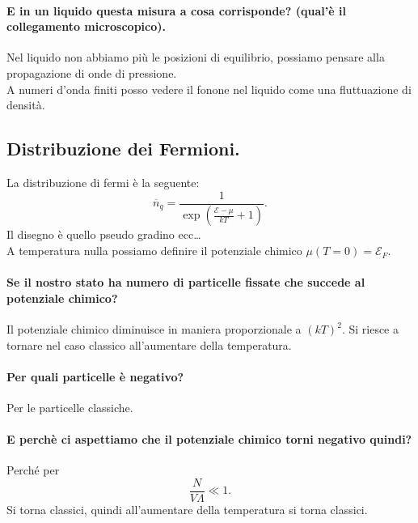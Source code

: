 \paragraph{E in un liquido questa misura a cosa corrisponde? (qual'è il collegamento microscopico).}%
\label{par:E in un liquido questa misura a cosa corrisponde? (qual'è il collegamento microscopico).}
Nel liquido non abbiamo più le posizioni di equilibrio, possiamo pensare alla propagazione di onde di pressione. \\
A numeri d'onda finiti posso vedere il fonone nel liquido come una fluttuazione di densità. 
\subsection{Distribuzione dei Fermioni.}%
\label{sub:Distribuzione dei Fermioni.}
La distribuzione di fermi è la seguente:
\[
    \overline{n}_q = \frac{1}{\exp\left(\frac{\mathcal{E}-\mu}{kT}+1\right)}
.\] 
Il disegno è quello pseudo gradino  ecc\ldots\\
A temperatura nulla possiamo definire il potenziale chimico $\mu (T=0) = \mathcal{E}_F$. 
\paragraph{Se il nostro stato ha numero di particelle fissate che succede al potenziale chimico?}%
\label{par:Se il nostro stato ha numero di particelle fissate che succede al potenziale chimico?}
Il potenziale chimico diminuisce in maniera proporzionale a $\left(kT\right)^2$. Si riesce a tornare nel caso classico all'aumentare della temperatura.
\paragraph{Per quali particelle è negativo?}%
\label{par:Per quali particelle è negativo?}
Per le particelle classiche.
\paragraph{E perchè ci aspettiamo che il potenziale chimico torni negativo quindi?}%
\label{par:E perchè ci aspettiamo che il potenziale chimico torni negativo quindi?}
Perché per 
\[
    \frac{N}{V\Lambda} \ll 1
.\] 
Si torna classici, quindi all'aumentare della temperatura si torna classici.
